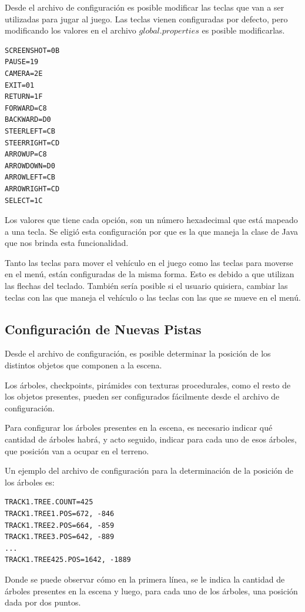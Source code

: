 \documentclass[a4paper,10pt]{article}
\begin{document}
Desde el archivo de configuraci\'on es posible modificar las teclas que van a
ser utilizadas para jugar al juego.  Las teclas vienen configuradas por
defecto, pero modificando los valores en el archivo $global.properties$ es
posible modificarlas.

\begin{verbatim}
SCREENSHOT=0B
PAUSE=19
CAMERA=2E
EXIT=01
RETURN=1F
FORWARD=C8
BACKWARD=D0
STEERLEFT=CB
STEERRIGHT=CD
ARROWUP=C8
ARROWDOWN=D0
ARROWLEFT=CB
ARROWRIGHT=CD
SELECT=1C
\end{verbatim}

Los valores que tiene cada opci\'on, son un n\'umero hexadecimal que est\'a
mapeado a una tecla.  Se eligi\'o esta configuraci\'on por que es la que maneja
la clase de Java que nos brinda esta funcionalidad.

Tanto las teclas para mover el veh\'iculo en el juego como las teclas para
moverse en el men\'u, est\'an configuradas de la misma forma.  Esto es debido a
que utilizan las flechas del teclado.  Tambi\'en ser\'ia posible si el usuario
quisiera, cambiar las teclas con las que maneja el veh\'iculo o las teclas con
las que se mueve en el men\'u.


\subsection{Configuraci\'on de Nuevas Pistas}

Desde el archivo de configuraci\'on, es posible determinar la posici\'on de los
distintos objetos que componen a la escena.

Los \'arboles, checkpoints, pir\'amides con texturas procedurales, como el resto
de
los objetos presentes, pueden ser configurados f\'acilmente desde el archivo de
configuraci\'on.

Para configurar los \'arboles presentes en la escena, es necesario indicar qu\'e
cantidad de \'arboles habr\'a, y acto seguido, indicar para cada uno de esos
\'arboles, que posici\'on van a ocupar en el terreno.

Un ejemplo del archivo de configuraci\'on para la determinaci\'on de la
posici\'on
de
los \'arboles es:

\begin{verbatim}
TRACK1.TREE.COUNT=425
TRACK1.TREE1.POS=672, -846
TRACK1.TREE2.POS=664, -859
TRACK1.TREE3.POS=642, -889
...
TRACK1.TREE425.POS=1642, -1889
\end{verbatim}

Donde se puede observar c\'omo en la primera l\'inea, se le indica la cantidad
de
\'arboles presentes en la escena y luego, para cada uno de los \'arboles, una
posici\'on dada por dos puntos.
\end{document}
